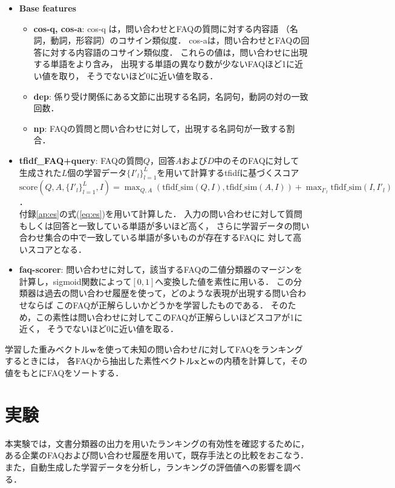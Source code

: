 \documentclass[japanese]{jnlp_1.4}
\begin{document}
\begin{itemize}
  \item {\bf Base features}
  \begin{itemize}
    \item {\bf cos-q, cos-a}: cos-q は，問い合わせとFAQの質問に対する内容語
      （名詞，動詞，形容詞）のコサイン類似度．
      cos-aは，問い合わせとFAQの回答に対する内容語のコサイン類似度．
      これらの値は，問い合わせに出現する単語をより含み，
      出現する単語の異なり数が少ないFAQほど1に近い値を取り，
      そうでないほど0に近い値を取る．
    \item {\bf dep}: 係り受け関係にある文節に出現する名詞，名詞句，動詞の対の一致回数．
    \item {\bf np}: FAQの質問と問い合わせに対して，出現する名詞句が一致する割合．
  \end{itemize}
\item {\bf tfidf\_FAQ+query}: FAQの質問$Q$，回答$A$および$D$中のそのFAQに対して
  生成された$L$個の学習データ$\{I'_l\}_{l=1}^L$を用いて計算するtfidfに基づくスコア\\
  $\textrm{score}(Q, A, \{I'_l\}_{l=1}^L, I) = 
  \max_{Q,A}(\textrm{tfidf\_sim}(Q, I), \textrm{tfidf\_sim}(A, I)) +
  \max_{{I'}_{l}} \textrm{tfidf\_sim}(I, I'_l)$．
\\
  付録\ref{ap:es}の式(\ref{eq:es})を用いて計算した．
  入力の問い合わせに対して質問もしくは回答と一致している単語が多いほど高く，
  さらに学習データの問い合わせ集合の中で一致している単語が多いものが存在するFAQに
  対して高いスコアとなる．
	\item {\bf faq-scorer}: 問い合わせに対して，該当するFAQの二値分類器のマージンを
    計算し，sigmoid関数によって$[0, 1]$へ変換した値を素性に用いる．
		この分類器は過去の問い合わせ履歴を使って，どのような表現が出現する問い合わせならば
    このFAQが正解らしいかどうかを学習したものである．
		そのため，この素性は問い合わせに対してこのFAQが正解らしいほどスコアが1に近く，
    そうでないほど0に近い値を取る．
\end{itemize}

学習した重みベクトル$\mathbf{w}$を使って未知の問い合わせ$I$に対してFAQをランキングするときには，
各FAQから抽出した素性ベクトル$\mathbf{x}$と$\mathbf{w}$の内積を計算して，その値をもとにFAQをソートする．


\section{実験}

  本実験では，文書分類器の出力を用いたランキングの有効性を確認するために，
ある企業のFAQおよび問い合わせ履歴を用いて，既存手法との比較をおこなう．
また，自動生成した学習データを分析し，ランキングの評価値への影響を調べる．
\end{document}
